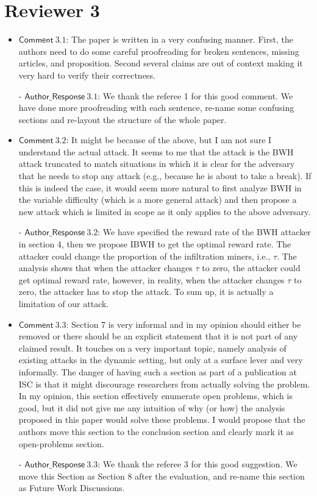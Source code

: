 \documentclass[]{article}
\newcommand{\AR}[1]{\mathsf{Author\_Response}\ #1}
\newcommand{\CM}[1]{{\mathsf{Comment}\ #1}}
\begin{document}
\section{Reviewer 3}
\begin{itemize}
	\item $\CM{3.1}$: The paper is written in a very confusing manner. First, the authors need to do some careful proofreading for broken sentences, missing articles, and proposition. Second several claims are out of context making it very hard to verify their correctness. 
    \item[-] $\AR{3.1}$: We thank the referee 1 for this good comment. We have done more proofreading with each sentence, re-name some confusing sections and re-layout the structure of the whole paper.



    \item $\CM{3.2}$: It might be because of the above, but I am not sure I understand the actual attack. It seems to me that the attack is the BWH attack truncated to match situations in which it is clear for the adversary that he needs to stop any attack (e.g., because he is about to take a break). If this is indeed the case, it would seem more natural to first analyze BWH in the variable difficulty (which is a more general attack) and then propose a new attack which is limited in scope as it only applies to the above adversary.
    \item[-] $\AR{3.2}$: We have specified the reward rate of the BWH attacker in section 4, then we propose IBWH to get the optimal reward rate. The attacker could change the proportion of the infiltration miners, i.e., $\tau$. The analysis shows that when the attacker changes $\tau$ to zero, the attacker could get optimal reward rate, however, in reality, when the attacker changes $\tau$ to zero, the attacker has to stop the attack. To sum up, it is actually a limitation of our attack.

\item $\CM{3.3}$: Section 7 is very informal and in my opinion should either be removed or there should be an explicit statement that it is not part of any claimed result. It touches on a very important topic, namely analysis of existing attacks in the dynamic setting, but only at a surface lever and very informally. The danger of having such a section as part of a publication at ISC is that it might discourage researchers from actually solving the problem. In my opinion, this section effectively enumerate open problems, which is good, but it did not give me any intuition of why (or how) the analysis proposed in this paper would solve these problems. I would propose that the authors move this section to the conclusion section and clearly mark it as open-problems section.
\item[-] $\AR{3.3}$: We thank the referee 3 for this good suggestion. We move this Section as Section 8 after the evaluation, and re-name this section as Future Work Discussions.


\end{itemize}
\end{document}
